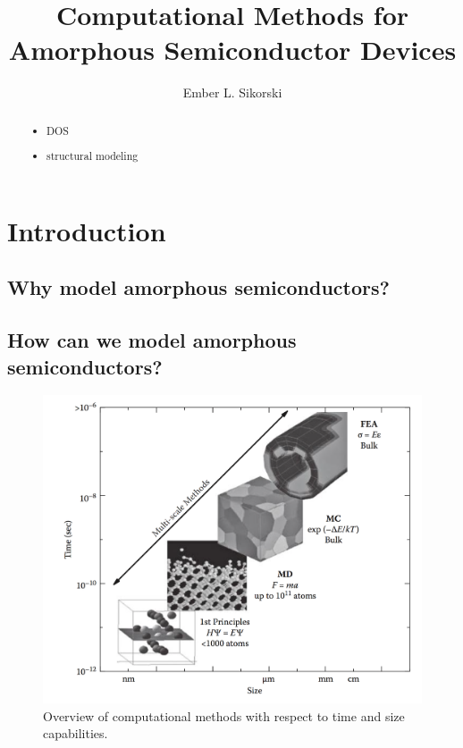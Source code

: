\documentclass[3p,review,12pt]{elsarticle}
\begin{document}
\begin{frontmatter}
	\title{Computational Methods for Amorphous Semiconductor Devices}
	
	\author[boise]{Ember L. Sikorski}
	
	
	\address[boise]{Boise State University}
	
	\begin{abstract}
\begin{itemize}
	\item DOS
	\item structural modeling
\end{itemize}
	\end{abstract}
	
	
\end{frontmatter}

\section{Introduction}
\subsection{Why model amorphous semiconductors?}


\subsection{How can we model amorphous semiconductors?}
\begin{figure}[H]
	\includegraphics[width=\textwidth]{overview}
	\caption{Overview of computational methods with respect to time and size capabilities.}
\end{figure}
\end{document}
